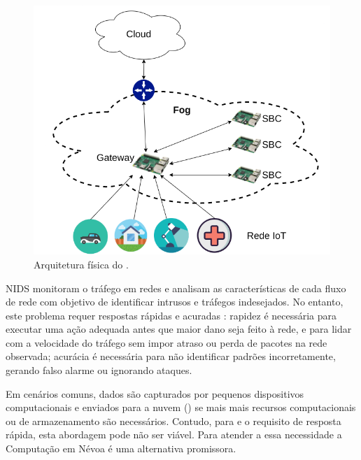 \begin{figure}[htb]
  \centerline{
    \includegraphics[width=0.6\linewidth,page=1]{figures/arq-mfog.png}
  }
  \caption{Arquitetura física do \mfog.}
  \label{fig:arq-fisica-mfog}
\end{figure}


\acf{NIDS} monitoram o tráfego em redes e analisam as características de cada
fluxo de rede com objetivo de identificar intrusos e tráfegos indesejados.
No entanto, este problema requer respostas rápidas e acuradas \cite{DaCosta2019a}:
rapidez é necessária para executar uma ação adequada antes que
maior dano seja feito à rede, e para lidar com a velocidade do tráfego sem impor
atraso ou perda de pacotes na rede observada;
acurácia é necessária para não  identificar padrões incorretamente, gerando falso
alarme ou ignorando ataques.


Em cenários \iot comuns, dados são capturados por pequenos dispositivos
computacionais e enviados para a nuvem (\cloud) se mais mais recursos
computacionais ou de armazenamento são necessários. Contudo, para \nids e o
requisito de resposta rápida, esta abordagem pode não ser viável. 
Para atender a essa necessidade a Computação em Névoa é uma alternativa promissora.


